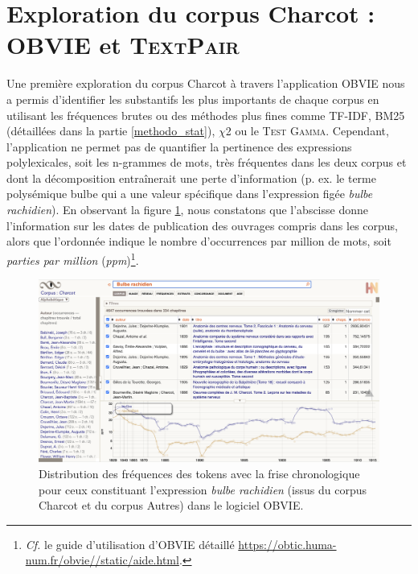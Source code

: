 \label{resultats}

\section{Exploration du corpus Charcot : \textsc{OBVIE} et \textsc{TextPair}}
Une première exploration du corpus Charcot à travers l'application OBVIE nous a permis d'identifier les substantifs les plus importants de chaque corpus en utilisant les fréquences brutes ou des méthodes plus fines comme \textsc{TF-IDF}, \textsc{BM25} (détaillées dans la partie \ref{methodo_stat}), \textsc{$\chi$2} ou le \textsc{Test Gamma}. Cependant, l'application ne permet pas de quantifier la pertinence des expressions polylexicales, soit les n-grammes de mots, très fréquentes dans les deux corpus et dont la décomposition entraînerait une perte d'information (p. ex. le terme polysémique \og{}bulbe\fg{} qui a une valeur spécifique dans l'expression figée \textit{bulbe rachidien}). En observant la figure \ref{fig:bulbe}, nous constatons que l'abscisse donne l'information sur les dates de publication des ouvrages compris dans les corpus, alors que l'ordonnée indique le nombre d'occurrences par million de mots, soit \textit{parties par million} (\textit{ppm})\footnote{\textit{Cf.} le guide d'utilisation d'\textsc{OBVIE} détaillé \url{https://obtic.huma-num.fr/obvie//static/aide.html}.}. 
\begin{figure}[!h]
    \centering
    \includegraphics[width=1\textwidth]{img/bulbe_rachidien_mini.png}
    \caption{Distribution des fréquences des tokens avec la frise chronologique pour ceux constituant l'expression \textit{bulbe rachidien} (issus du corpus \og{}Charcot\fg{} et du corpus \og{}Autres\fg{}) dans le logiciel OBVIE.
    }
    \label{fig:bulbe}
\end{figure}

